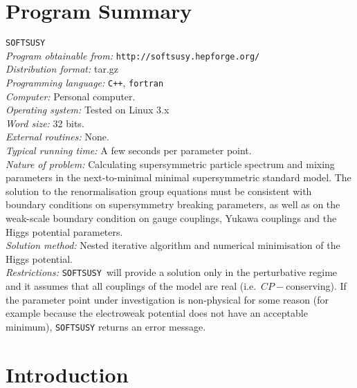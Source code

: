 \documentclass[final,3p,times,pdflatex]{elsarticle}
\def\SOFTSUSY{{\tt SOFTSUSY}}
\begin{document}
\section{Program Summary}
 \SOFTSUSY{}\\
{\em Program obtainable   from:} {\tt http://softsusy.hepforge.org/}\\
{\em Distribution format:}\/ tar.gz\\
{\em Programming language:} {\tt C++}, {\tt fortran}\\
{\em Computer:}\/ Personal computer.\\
{\em Operating system:}\/ Tested on Linux 3.x\\
{\em Word size:}\/ 32 bits.\\
{\em External routines:}\/ None.\\
{\em Typical running time:}\/ A few seconds per parameter point.\\
{\em Nature of problem:}\/ Calculating supersymmetric particle spectrum and
mixing parameters in the next-to-minimal minimal supersymmetric standard
model. The solution to the renormalisation group equations must be consistent
with boundary conditions on supersymmetry breaking parameters, as
well as on the weak-scale boundary condition on gauge 
couplings, Yukawa couplings and the Higgs potential parameters.\\
{\em Solution method:}\/ Nested iterative algorithm and numerical minimisation
of the Higgs potential. \\
{\em Restrictions:} \SOFTSUSY~will provide a solution only in the
perturbative regime and it
assumes that all couplings of the model are real
(i.e.\ $CP-$conserving). If the parameter point under investigation is
non-physical for some reason (for example because the electroweak potential
does not have an acceptable minimum), \SOFTSUSY{} returns an error message.

\newpage

\section{Introduction}
\end{document}
